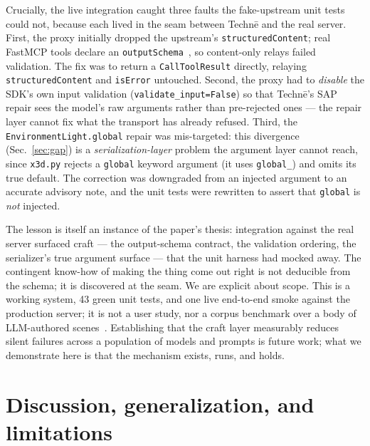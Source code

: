 \documentclass[sigconf,nonacm,screen,anonymous]{acmart}
\begin{document}
Crucially, the live integration caught three faults the fake-upstream unit tests could not, because each lived in the seam between Techn\=e and the real server. First, the proxy initially dropped the upstream's \texttt{structuredContent}; real FastMCP tools declare an \texttt{outputSchema}~\cite{jsonschema}, so content-only relays failed validation. The fix was to return a \texttt{CallToolResult} directly, relaying \texttt{structuredContent} and \texttt{isError} untouched. Second, the proxy had to \emph{disable} the SDK's own input validation (\texttt{validate\_input=False}) so that Techn\=e's SAP repair sees the model's raw arguments rather than pre-rejected ones --- the repair layer cannot fix what the transport has already refused. Third, the \texttt{EnvironmentLight.global} repair was mis-targeted: this divergence (Sec.~\ref{sec:gap}) is a \emph{serialization-layer} problem the argument layer cannot reach, since \texttt{x3d.py} rejects a \texttt{global} keyword argument (it uses \texttt{global\_}) and omits its true default. The correction was downgraded from an injected argument to an accurate advisory note, and the unit tests were rewritten to assert that \texttt{global} is \emph{not} injected.

The lesson is itself an instance of the paper's thesis: integration against the real server surfaced craft --- the output-schema contract, the validation ordering, the serializer's true argument surface --- that the unit harness had mocked away. The contingent know-how of making the thing come out right is not deducible from the schema; it is discovered at the seam. We are explicit about scope. This is a working system, 43 green unit tests, and one live end-to-end smoke against the production server; it is not a user study, nor a corpus benchmark over a body of LLM-authored scenes~\cite{prompteng,x3dexamples}. Establishing that the craft layer measurably reduces silent failures across a population of models and prompts is future work; what we demonstrate here is that the mechanism exists, runs, and holds.

\section{Discussion, generalization, and limitations}\label{sec:discussion}
\end{document}
